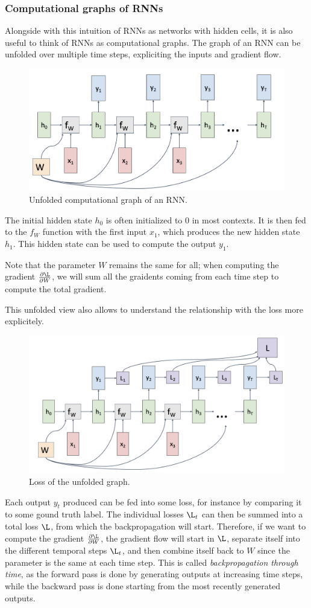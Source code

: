 \subsubsection{Computational graphs of RNNs}
Alongside with this intuition of RNNs as networks with hidden cells, it is also useful to think of RNNs as computational graphs. The graph of an RNN can be unfolded over multiple time steps, expliciting the inputs and gradient flow.
\begin{figure}[H]
    \centering
    \includegraphics[width=.7\textwidth]{images/rnn-graph.png}
    \caption{Unfolded computational graph of an RNN.}
\end{figure}
The initial hidden state $h_0$ is often initialized to 0 in most contexts. It is then fed to the $f_W$ function with the first input $x_1$, which produces the new hidden state $h_1$. This hidden state can be used to compute the output $y_1$.

Note that the parameter $W$ remains the same for all; when computing the gradient $\frac{\partial\L}{\partial W}$, we will sum all the graidents coming from each time step to compute the total gradient.

This unfolded view also allows to understand the relationship with the loss more explicitely.
\begin{figure}[H]
    \centering
    \includegraphics[width=.7\textwidth]{images/graph-loss.png}
    \caption{Loss of the unfolded graph.}
\end{figure}
Each output $y_t$ produced can be fed into some loss, for instance by comparing it to some gound truth label. The individual losses $\L_t$ can then be summed into a total loss $\L$, from which the backpropagation will start. Therefore, if we want to compute the gradient $\frac{\partial\L}{\partial W}$, the gradient flow will start in $\L$, separate itself into the different temporal steps $\L_t$, and then combine itself back to $W$ since the parameter is the same at each time step. This is called \emph{backpropagation through time}, as the forward pass is done by generating outputs at increasing time steps, while the backward pass is done starting from the most recently generated outputs.

